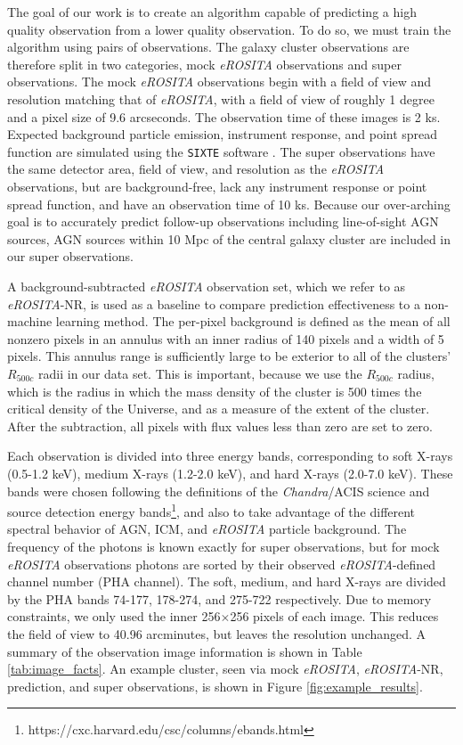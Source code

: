 The goal of our work is to create an algorithm capable of predicting a high quality observation from a lower quality observation. To do so, we must train the algorithm using pairs of observations. The galaxy cluster observations are therefore split in two categories, mock \textit{eROSITA} observations and super observations. The mock \textit{eROSITA} observations begin with a field of view and resolution matching that of \textit{eROSITA}, with a field of view of roughly 1 degree and a pixel size of 9.6 arcseconds. The observation time of these images is 2 ks. Expected background particle emission, instrument response, and point spread function are simulated using the \texttt{SIXTE} software \cite{SIXTE}. The super observations have the same detector area, field of view, and resolution as the \textit{eROSITA} observations, but are background-free, lack any instrument response or point spread function, and have an observation time of 10 ks. Because our over-arching goal is to accurately predict follow-up observations including line-of-sight AGN sources, AGN sources within 10 Mpc of the central galaxy cluster are included in our super observations. 

A background-subtracted \textit{eROSITA} observation set, which we refer to as \textit{eROSITA}-NR, is used as a baseline to compare prediction effectiveness to a non-machine learning method. The per-pixel background is defined as the mean of all nonzero pixels in an annulus with an inner radius of 140 pixels and a width of 5 pixels. This annulus range is sufficiently large to be exterior to all of the clusters' $R_{500c}$ radii in our data set. This is important, because we use the $R_{500c}$ radius, which is the radius in which the mass density of the cluster is 500 times the critical density of the Universe, and as a measure of the extent of the cluster. After the subtraction, all pixels with flux values less than zero are set to zero.

Each observation is divided into three energy bands, corresponding to soft X-rays (0.5-1.2 keV), medium X-rays (1.2-2.0 keV), and hard X-rays (2.0-7.0 keV). These bands were chosen following the definitions of the \textit{Chandra}/ACIS science and source detection energy bands\footnote{https://cxc.harvard.edu/csc/columns/ebands.html}, and also to take advantage of the different spectral behavior of AGN, ICM, and \textit{eROSITA} particle background. The frequency of the photons is known exactly for super observations, but for mock \textit{eROSITA} observations photons are sorted by their observed \textit{eROSITA}-defined channel number (PHA channel). The soft, medium, and hard X-rays are divided by the PHA bands 74-177, 178-274, and 275-722 respectively. Due to memory constraints, we only used the inner 256$\times$256 pixels of each image. This reduces the field of view to 40.96 arcminutes, but leaves the resolution unchanged. A summary of the observation image information is shown in Table \ref{tab:image_facts}. An example cluster, seen via mock \textit{eROSITA}, \textit{eROSITA}-NR, prediction, and super observations, is shown in Figure \ref{fig:example_results}.



